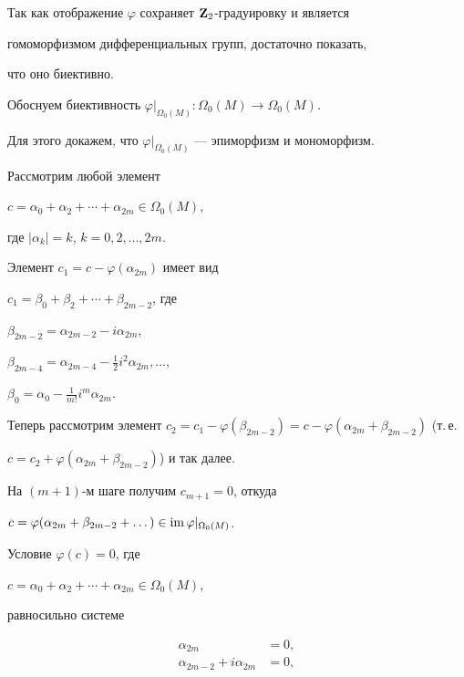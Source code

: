 \begin{pf}


Так как отображение $\varphi$ сохраняет $\bold Z_2$-градуировку и является


гомоморфизмом дифференциальных групп, достаточно показать,


что оно биективно.





Обоснуем биективность $\varphi|_{\Omega_0(M)}:\Omega_0(M)\to\Omega_0(M)$.





Для этого докажем, что $\varphi|_{\Omega_0(M)}$ --- эпиморфизм и мономорфизм.


Рассмотрим любой элемент


$c=\alpha_0 +\alpha_2+\dotsb +\alpha_{2m}\in \Omega_0(M)$,


где $|\alpha_k| = k$, $k=0,2,\dotsc,2m$.


Элемент $c_1=c-\varphi(\alpha_{2m})$ имеет вид


$c_1=\beta_0+\beta_2+\dotsb +\beta_{2m-2}$, где


$\beta_{2m-2}=\alpha_{2m-2}-i\alpha_{2m}$,


$\beta_{2m-4}=\alpha_{2m-4}-\frac12i^2\alpha_{2m}, \dots$,


$\beta_{0}=\alpha_{0}-\frac1{m!}i^m\alpha_{2m}$.


Теперь рассмотрим элемент $c_2 = c_1-\varphi(\beta_{2m-2})=


c- \varphi(\alpha_{2m}+\beta_{2m-2})$ (т.\,е.


$c=c_2+\varphi(\alpha_{2m}+\beta_{2m-2})$) и так далее.


На $(m+1)$-м шаге получим $c_{m+1}=0$, откуда


$c=\varphi(\alpha_{2m}+\beta_{2m-2}+\dots)\in


\im\varphi|_{\Omega_0(M)}$.





Условие $\varphi(c)=0$, где


$c=\alpha_0 +\alpha_2+\dotsb +\alpha_{2m}\in \Omega_0(M)$,


равносильно системе


\begin{align*}


\alpha_{2m}&=0,\\


\alpha_{2m-2}+i\alpha_{2m}&=0,\\



\end{align*}
\end{pf}

